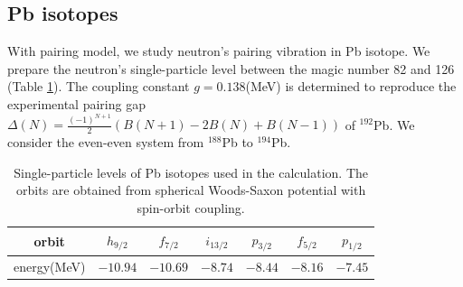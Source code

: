 \documentclass[%
superscriptaddress,
showpacs,
nofootinbib,
amsmath,amssymb,
aps,
prc,
twocolumn,
floatfix ]%
{revtex4-1}
\begin{document}
\subsection{Pb isotopes}
With pairing model, we study neutron's pairing vibration in Pb isotope. We prepare the neutron's single-particle level between the magic number 82 and 126 (Table \ref{Pb}). The coupling constant $g=0.138$(MeV) is determined to reproduce the experimental pairing gap $\Delta(N)=\frac{(-1)^{N+1}}{2}(B(N+1)-2B(N)+B(N-1))$ of ${}^{192}$Pb. We consider the even-even system from ${}^{188}$Pb to ${}^{194}$Pb.
\begin{table}[htbp]
\begin{ruledtabular}
\begin{tabular}{c|cccccc}
  orbit& $h_{9/2}$ & $f_{7/2}$ & $i_{13/2}$ & $p_{3/2}$ & $f_{5/2}$ & $p_{1/2}$\\ \hline
  energy(MeV)& $-10.94$ & $-10.69$ & $-8.74$ & $-8.44$ & $-8.16$ & $-7.45$\\
\end{tabular}
\end{ruledtabular}
\caption{Single-particle levels of Pb isotopes used in the calculation. The orbits are obtained from spherical Woods-Saxon potential with spin-orbit coupling. }
\label{Pb}
\end{table}
\end{document}
